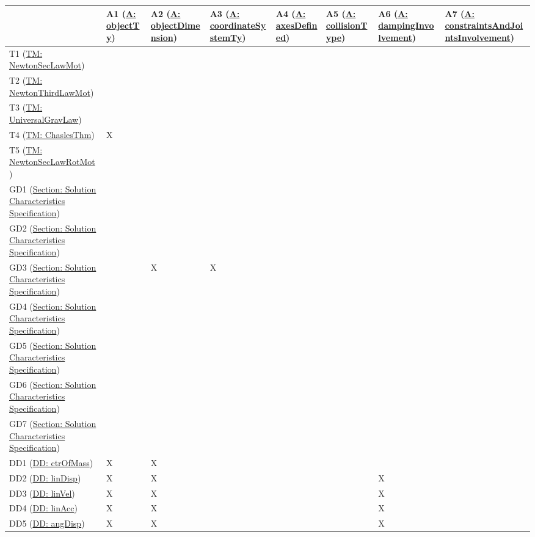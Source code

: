 \documentclass[12pt]{article}
\begin{document}
\begin{longtable}{l l l l l l l l}
\toprule
 & A1 (\hyperref[assumpOT]{A: objectTy}) & A2 (\hyperref[assumpOD]{A: objectDimension}) & A3 (\hyperref[assumpCST]{A: coordinateSystemTy}) & A4 (\hyperref[assumpAD]{A: axesDefined}) & A5 (\hyperref[assumpCT]{A: collisionType}) & A6 (\hyperref[assumpDI]{A: dampingInvolvement}) & A7 (\hyperref[assumpCAJI]{A: constraintsAndJointsInvolvement})
\\
\midrule
\endhead
T1 (\hyperref[TM:NewtonSecLawMot]{TM: NewtonSecLawMot}) &  &  &  &  &  &  & 
\\
T2 (\hyperref[TM:NewtonThirdLawMot]{TM: NewtonThirdLawMot}) &  &  &  &  &  &  & 
\\
T3 (\hyperref[TM:UniversalGravLaw]{TM: UniversalGravLaw}) &  &  &  &  &  &  & 
\\
T4 (\hyperref[TM:ChaslesThm]{TM: ChaslesThm}) & X &  &  &  &  &  & 
\\
T5 (\hyperref[TM:NewtonSecLawRotMot]{TM: NewtonSecLawRotMot}) &  &  &  &  &  &  & 
\\
GD1 (\hyperref[Sec:SolCharSpec]{Section: Solution Characteristics Specification}) &  &  &  &  &  &  & 
\\
GD2 (\hyperref[Sec:SolCharSpec]{Section: Solution Characteristics Specification}) &  &  &  &  &  &  & 
\\
GD3 (\hyperref[Sec:SolCharSpec]{Section: Solution Characteristics Specification}) &  & X & X &  &  &  & 
\\
GD4 (\hyperref[Sec:SolCharSpec]{Section: Solution Characteristics Specification}) &  &  &  &  &  &  & 
\\
GD5 (\hyperref[Sec:SolCharSpec]{Section: Solution Characteristics Specification}) &  &  &  &  &  &  & 
\\
GD6 (\hyperref[Sec:SolCharSpec]{Section: Solution Characteristics Specification}) &  &  &  &  &  &  & 
\\
GD7 (\hyperref[Sec:SolCharSpec]{Section: Solution Characteristics Specification}) &  &  &  &  &  &  & 
\\
DD1 (\hyperref[DD:ctrOfMass]{DD: ctrOfMass}) & X & X &  &  &  &  & 
\\
DD2 (\hyperref[DD:linDisp]{DD: linDisp}) & X & X &  &  &  & X & 
\\
DD3 (\hyperref[DD:linVel]{DD: linVel}) & X & X &  &  &  & X & 
\\
DD4 (\hyperref[DD:linAcc]{DD: linAcc}) & X & X &  &  &  & X & 
\\
DD5 (\hyperref[DD:angDisp]{DD: angDisp}) & X & X &  &  &  & X & 

\end{longtable}
\end{document}
